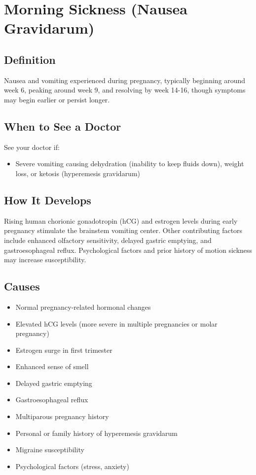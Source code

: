 \chapter{Morning Sickness (Nausea Gravidarum)}

\section*{Definition}
Nausea and vomiting experienced during pregnancy, typically beginning around week 6, peaking around week 9, and resolving by week 14-16, though symptoms may begin earlier or persist longer.

\section*{When to See a Doctor}
See your doctor if:
\begin{itemize}
  \item Severe vomiting causing dehydration (inability to keep fluids down), weight loss, or ketosis (hyperemesis gravidarum)
\end{itemize}

\section*{How It Develops}
Rising human chorionic gonadotropin (hCG) and estrogen levels during early pregnancy stimulate the brainstem vomiting center. Other contributing factors include enhanced olfactory sensitivity, delayed gastric emptying, and gastroesophageal reflux. Psychological factors and prior history of motion sickness may increase susceptibility.

\section*{Causes}
\begin{itemize}
  \item Normal pregnancy-related hormonal changes
  \item Elevated hCG levels (more severe in multiple pregnancies or molar pregnancy)
  \item Estrogen surge in first trimester
  \item Enhanced sense of smell
  \item Delayed gastric emptying
  \item Gastroesophageal reflux
  \item Multiparous pregnancy history
  \item Personal or family history of hyperemesis gravidarum
  \item Migraine susceptibility
  \item Psychological factors (stress, anxiety)
\end{itemize}


